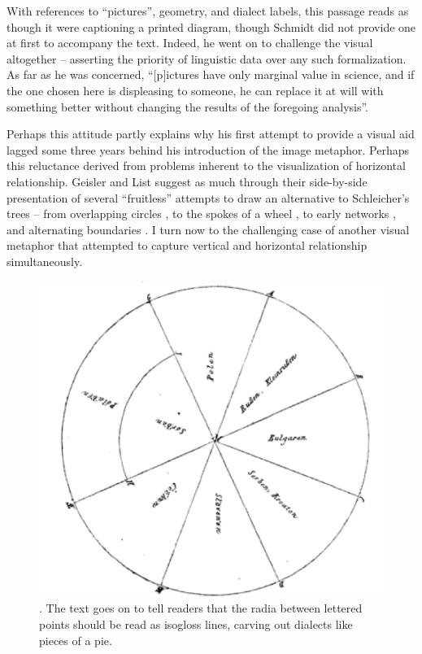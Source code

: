 \documentclass[output=paper]{langscibook}
\begin{document}
With references to ``pictures'', geometry, and dialect labels, this passage reads as though it were captioning a printed diagram, though Schmidt did not provide one at first to accompany the text. Indeed, he went on to challenge the visual altogether -- asserting the priority of linguistic data over any such formalization. As far as he was concerned, ``[p]ictures have only marginal value in science, and if the one chosen here is displeasing to someone, he can replace it at will with something better without changing the results of the foregoing analysis''.

Perhaps this attitude partly explains why his first attempt to provide a visual aid lagged some three years behind his introduction of the image metaphor. Perhaps this reluctance derived from problems inherent to the visualization of horizontal relationship. Geisler and List suggest as much through their side-by-side presentation of several ``fruitless'' attempts to draw an alternative to Schleicher's trees -- from overlapping circles \citep{Hirt1905}, to the spokes of a wheel \citep{Meillet1908}, to early networks \citep{bonfante1931}, and alternating boundaries \citep{Bloomfield1933}. I turn now to the challenging case of another visual metaphor that attempted to capture vertical and horizontal relationship simultaneously.

\begin{figure}
    \centering
    \includegraphics[scale=1]{figures/schmidt1875.png}
    \caption{\citet[199]{Schmidt1875}. The text goes on to tell readers that the radia between lettered points should be read as isogloss lines, carving out dialects like pieces of a pie.}
    \label{fig:kaplan:schmidt}
\end{figure}
\end{document}

